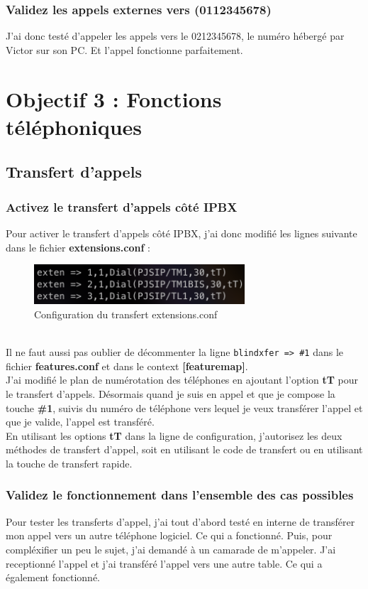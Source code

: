 \documentclass[12pt, a4paper]{article}
\begin{document}
	\subsubsection{Validez les appels externes vers (0112345678)}
	J'ai donc testé d'appeler les appels vers le 0212345678, le numéro hébergé par
	Victor sur son PC. Et l'appel fonctionne parfaitement. 

\newpage
\section{Objectif 3 : Fonctions téléphoniques}
\subsection{Transfert d'appels}
	\subsubsection{Activez le transfert d'appels côté IPBX}
	Pour activer le transfert d'appels côté IPBX, j'ai donc modifié les lignes suivante 
	dans le fichier \textbf{extensions.conf} :
	\begin{figure}[h]
		\centering
		\includegraphics[width=0.7\textwidth]{img/tT.png}
		\caption{Configuration du transfert extensions.conf}
		\label{fig:trans}
	\end{figure}\\
	Il ne faut aussi pas oublier de décommenter la ligne \texttt{blindxfer => \#1}
	dans le fichier \textbf{features.conf} et dans le context \textbf{[featuremap]}.\\

	J'ai modifié le plan de numérotation des téléphones en ajoutant l'option
	\textbf{tT} pour le transfert d'appels. Désormais quand je suis en appel
	et que je compose la touche \textbf{\#1}, suivis du numéro de téléphone
	vers lequel je veux transférer l'appel et que je valide, l'appel est transféré.\\

	En utilisant les options \textbf{tT} dans la ligne de configuration, j'autorisez 
	les deux méthodes de transfert d'appel, soit en utilisant le code de 
	transfert ou en utilisant la touche de transfert rapide.

	\subsubsection{Validez le fonctionnement dans l'ensemble des cas possibles}
	Pour tester les transferts d'appel, j'ai tout d'abord testé en interne de 
	transférer mon appel vers un autre téléphone logiciel. Ce qui a fonctionné.
	Puis, pour compléxifier un peu le sujet, j'ai demandé à un camarade 
	de m'appeler. J'ai receptionné l'appel et j'ai transféré l'appel vers
	une autre table. Ce qui a également fonctionné.\\
\end{document}
